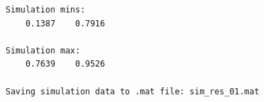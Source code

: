 \documentclass{article}
\begin{document}
\begin{verbatim}
Simulation mins:
    0.1387    0.7916

Simulation max:
    0.7639    0.9526

Saving simulation data to .mat file: sim_res_01.mat
\end{verbatim} \color{black}




\end{document}

